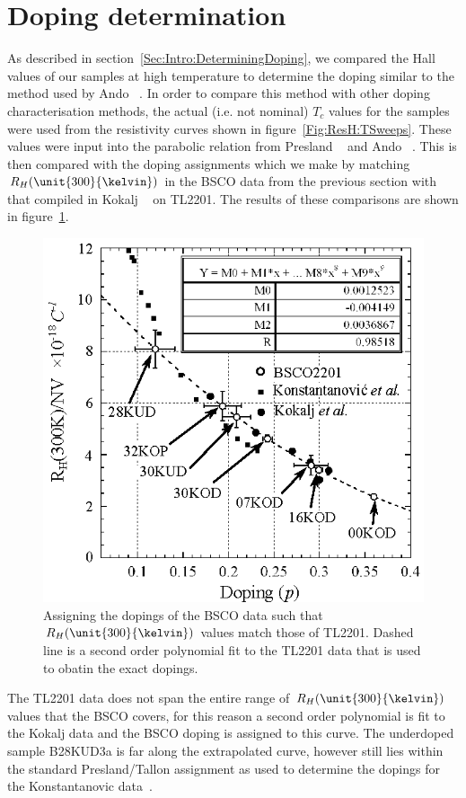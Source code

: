 
\section{Doping determination}
    \label{Sec:ResH:DopingDetermination}

As described in section~\ref{Sec:Intro:DeterminingDoping}, we compared the Hall values of our samples at high temperature to determine the doping similar to the method used by Ando \etal~\cite{Ando2000}. In order to compare this method with other doping characterisation methods, the actual (i.e. not nominal) $T_c$ values for the samples were used from the resistivity curves shown in figure~\ref{Fig:ResH:TSweeps}. These values were input into the parabolic relation from Presland \etal~\cite{Presland1991} and Ando \etal~\cite{Ando2000}. This is then compared with the doping assignments which we make by matching $R_H(\unit{300}{\kelvin})$ in the \ac{BSCO} data from the previous section with that compiled in Kokalj \etal~\cite{Kokalj2012} on \ac{TL2201}. The results of these comparisons are shown in figure~\ref{Fig:ResH:DopingRh300}.
\begin{figure}[htbp]
    \begin{center}
        \includegraphics[scale=1.1]{Chapter-HallBSCO/Figures/DopingRh300/DopingRh300}
        \caption{Assigning the dopings of the \ac{BSCO} data such that $R_H(\unit{300}{\kelvin})$ values match those of \ac{TL2201}. Dashed line is a second order polynomial fit to the \ac{TL2201} data that is used to obatin the exact dopings.}
        \label{Fig:ResH:DopingRh300}
    \end{center}
\end{figure}
The \ac{TL2201} data does not span the entire range of $R_H(\unit{300}{\kelvin})$ values that the \ac{BSCO} covers, for this reason a second order polynomial is fit to the Kokalj data and the \ac{BSCO} doping is assigned to this curve. The underdoped sample B28KUD3a is far along the extrapolated curve, however still lies within the standard Presland/Tallon assignment as used to determine the dopings for the Konstantanovic data~\cite{Konstantinovic2001}.

